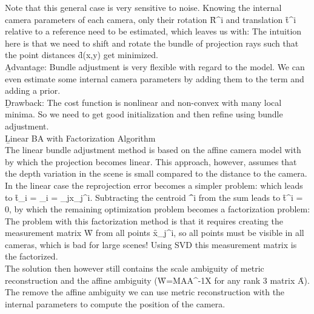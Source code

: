 Note that this general case is very sensitive to noise. Knowing the internal camera parameters of each camera, only their rotation \f{R^i} and translation \f{t^i} relative to a reference need to be estimated, which leaves us with:
The intuition here is that we need to shift and rotate the bundle of projection rays such that the point distances \f{d(x,y)} get minimized.\\

\b{Advantage:} Bundle adjustment is very flexible with regard to the model. We can even estimate some internal camera parameters by adding them to the term and adding a prior.\\
\b{Drawback:} The cost function is nonlinear and non-convex with many local minima. So we need to get good initialization and then refine using bundle adjustment.\\

\b{Linear BA with Factorization Algorithm\\[.5em]}
The linear bundle adjustment method is based on the affine camera model with 
by which the projection becomes linear. This approach, however, assumes that the depth variation in the scene is small compared to the distance to the camera. In the linear case the reprojection error becomes a simpler problem:
which leads to \f{t_i = \mu_i = \sum_jx_j^i}. Subtracting the centroid \f{\mu^i} from the sum leads to \f{t^i = 0}, by which the remaining optimization problem becomes a factorization problem:
The problem with this factorization method is that it requires creating the measurement matrix \f{W} from all points \f{x_j^i}, so all points must be visible in all cameras, which is bad for large scenes! Using SVD this measurement matrix is the factorized.\\
The solution then however still contains the scale ambiguity of metric reconstruction and the affine ambiguity (\f{W=MAA^{-1}X} for any rank 3 matrix \f{A}). The remove the affine ambiguity we can use metric reconstruction with the internal parameters to compute the position of the camera.\\

